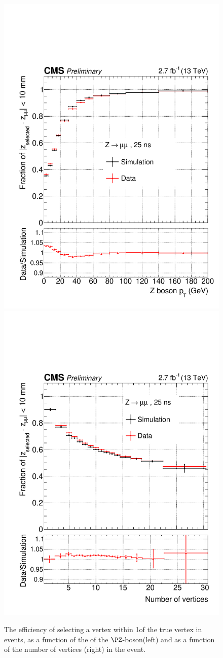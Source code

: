 \begin{figure}
\begin{center}
\includegraphics[width=0.49\linewidth]{recoFigures/last_Zmumu_eff_vs_pt_76X_VariableBins_ChangeHLT.pdf}
\includegraphics[width=0.49\linewidth]{recoFigures/last_Zmumu_eff_vs_nVtx_76X_VariableBins_ChangeHLT.pdf}
\caption{The efficiency of selecting a vertex within 1\cm of the true vertex in \Zmumu events, as a function of the \pT of the $\PZ$-boson(left) and as a function of the number of vertices (right) in the event.}
\label{fig:reco:vtx_id_eff_zmumu_validation}
\end{center}
\end{figure}

